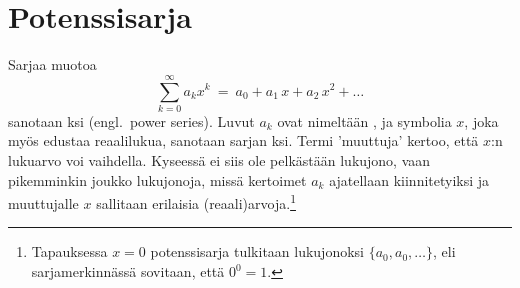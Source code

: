 \section{Potenssisarja} \label{potenssisarja}
\alku

Sarjaa muotoa
\[
\sum_{k=0}^\infty a_k x^k\ =\ a_0 + a_1\,x + a_2\,x^2 + \ldots
\]
sanotaan ksi (engl.\ power series). Luvut $a_k$ ovat nimeltään 
, ja symbolia $x$, joka myös edustaa reaalilukua, sanotaan sarjan
ksi. Termi 'muuttuja' kertoo, että $x$:n lukuarvo voi vaihdella. Kyseessä ei siis
ole pelkästään lukujono, vaan pikemminkin joukko lukujonoja, missä kertoimet $a_k$ ajatellaan 
kiinnitetyiksi ja muuttujalle $x$ sallitaan erilaisia (reaali)arvoja.\footnote[1]{Tapauksessa
$x=0$ potenssisarja tulkitaan lukujonoksi $\{a_0,a_0,\ldots\}$, eli sarjamerkinnässä sovitaan,
että $0^0=1$.}

